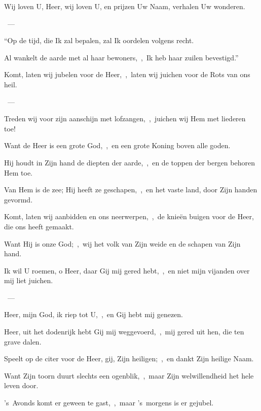 \documentclass[12pt,twoside,a5paper]{article}
\begin{document}

\begin{halfparskip}
  Wij loven U, Heer, wij loven U, en prijzen Uw Naam, verhalen Uw wonderen.

  ~--- 

  ``Op de tijd, die Ik zal bepalen, zal Ik oordelen volgens recht.

  Al wankelt de aarde met al haar bewoners,~\sep\ Ik heb haar zuilen bevestigd.''
\end{halfparskip}


\begin{halfparskip}
  Komt, laten wij jubelen voor de Heer,~\sep\ laten wij juichen voor de Rots van ons heil.

  ~--- 

  Treden wij voor zijn aanschijn met lofzangen,~\sep\ juichen wij Hem met liederen toe!

  Want de Heer is een grote God,~\sep\ en een grote Koning boven alle goden.

  Hij houdt in Zijn hand de diepten der aarde,~\sep\ en de toppen der bergen behoren Hem toe.

  Van Hem is de zee; Hij heeft ze geschapen,~\sep\ en het vaste land, door Zijn handen gevormd.

  Komt, laten wij aanbidden en ons neerwerpen,~\sep\ de knieën buigen voor de Heer, die ons heeft gemaakt.

  Want Hij is onze God;~\sep\ wij het volk van Zijn weide en de schapen van Zijn hand.
\end{halfparskip}


\begin{halfparskip}
  Ik wil U roemen, o Heer, daar Gij mij gered hebt,~\sep\ en niet mijn vijanden over mij liet juichen.

  ~--- 

  Heer, mijn God, ik riep tot U,~\sep\ en Gij hebt mij genezen.

  Heer, uit het dodenrijk hebt Gij mij weggevoerd,~\sep\ mij gered uit hen, die ten grave dalen.

  Speelt op de citer voor de Heer, gij, Zijn heiligen;~\sep\ en dankt Zijn heilige Naam.

  Want Zijn toorn duurt slechts een ogenblik,~\sep\ maar Zijn welwillendheid het hele leven door.

  's~Avonds komt er geween te gast,~\sep\ maar 's~morgens is er gejubel.
\end{halfparskip}
\end{document}
